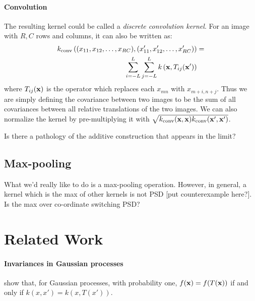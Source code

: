 \paragraph{Convolution} The resulting kernel could be called a \emph{discrete convolution kernel}.  For an image with $R, C$ rows and columns, it can also be written as:
%
\begin{align}
k_{\textnormal{conv}} \left( (x_{11}, x_{12}, \dots, x_{RC} ), (x_{11}', x_{12}', \dots, x_{RC}' ) \right) & = \nonumber \\
\sum_{i=-L}^L \sum_{j=-L}^L k\left( {\bf{x}}, T_{ij}({\bf{x}}') \right)
\end{align}
%
where $T_{ij}({\bf{x}})$ is the operator which replaces each $x_{mn}$ with $x_{m+i, n+j}$.  Thus we are simply defining the covariance between two images to be the sum of all covariances between all relative translations of the two images.  We can also normalize the kernel by pre-multiplying it with $\sqrt{k_{\textnormal{conv}}({\bf{x}}, {\bf{x}}) k_{\textnormal{conv}}({\bf{x}}', {\bf{x}}') }$.




Is there a pathology of the additive construction that appears in the limit?

\subsection{Max-pooling}
What we'd really like to do is a max-pooling operation.  However, in general, a kernel which is the max of other kernels is not PSD [put counterexample here?].  Is the max over co-ordinate switching PSD?

\section{Related Work}
\label{sec:related_work}

\paragraph{Invariances in Gaussian processes}
\cite{Invariances13} show that, for Gaussian processes, with probability one, $f({\bf{x}}) = f(T({\bf{x}}))$ if and only if $k(x, x') = k(x, T(x'))$.


